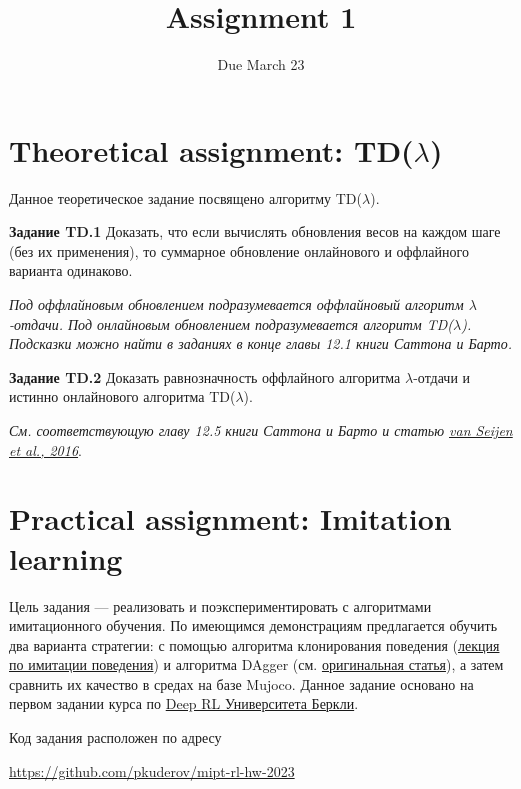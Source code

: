 \documentclass[12pt, oneside]{article}
\author{Due March 23}
\title{Assignment 1}
\date{}
\begin{document}
\maketitle
\thispagestyle{fancy}

\section{Theoretical assignment: TD($\lambda$)}

Данное теоретическое задание посвящено алгоритму TD($\lambda$).

\textbf{Задание TD.1} Доказать, что если вычислять обновления весов на каждом шаге (без их применения), то суммарное обновление онлайнового и оффлайного варианта одинаково.

\textit{Под оффлайновым обновлением подразумевается оффлайновый алгоритм $\lambda$-отдачи. Под онлайновым обновлением подразумевается алгоритм TD($\lambda$). Подсказки можно найти в заданиях в конце главы 12.1 книги Саттона и Барто.}

\textbf{Задание TD.2} Доказать равнозначность оффлайного алгоритма $\lambda$-отдачи и истинно онлайнового алгоритма TD($\lambda$).

\textit{См. соответствующую главу 12.5 книги Саттона и Барто и статью \href{https://www.jmlr.org/papers/volume17/15-599/15-599.pdf}{van Seijen et al., 2016}}.

\section{Practical assignment: Imitation learning}

Цель задания --- реализовать и поэкспериментировать с алгоритмами имитационного обучения. По имеющимся демонстрациям предлагается обучить два варианта стратегии: с помощью алгоритма клонирования поведения (\href{https://youtu.be/HUzyjOsd2PA?list=PL_iWQOsE6TfURIIhCrlt-wj9ByIVpbfGc}{лекция по имитации поведения}) и алгоритма DAgger (см. \href{http://proceedings.mlr.press/v15/ross11a/ross11a.pdf}{оригинальная статья}), а затем сравнить их качество в средах на базе Mujoco. Данное задание основано на первом задании курса по \href{http://rail.eecs.berkeley.edu/deeprlcourse/}{Deep RL Университета Беркли}.

Код задания расположен по адресу
\begin{center}
    \href{https://github.com/pkuderov/mipt-rl-hw-2023}{https://github.com/pkuderov/mipt-rl-hw-2023}
\end{center}
\end{document}
